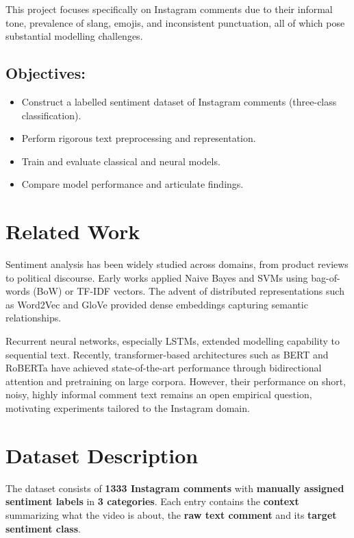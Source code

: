 \documentclass[11pt,a4paper]{article}
\begin{document}
This project focuses specifically on Instagram comments due to their informal tone, prevalence of slang, emojis, and inconsistent punctuation, all of which pose substantial modelling challenges.

\vspace{0.5em}
\subsection*{Objectives:}
\begin{itemize}
    \item Construct a labelled sentiment dataset of Instagram comments (three-class classification).
    \item Perform rigorous text preprocessing and representation.
    \item Train and evaluate classical and neural models.
    \item Compare model performance and articulate findings.
\end{itemize}


\section{Related Work}
Sentiment analysis has been widely studied across domains, from product reviews to political discourse. Early works applied Naive Bayes and SVMs using bag-of-words (BoW) or TF-IDF vectors. The advent of distributed representations such as Word2Vec and GloVe provided dense embeddings capturing semantic relationships.

Recurrent neural networks, especially LSTMs, extended modelling capability to sequential text. Recently, transformer-based architectures such as BERT and RoBERTa have achieved state-of-the-art performance through bidirectional attention and pretraining on large corpora. However, their performance on short, noisy, highly informal comment text remains an open empirical question, motivating experiments tailored to the Instagram domain.


\section{Dataset Description}
The dataset consists of \textbf{1333 Instagram comments} with \textbf{manually assigned sentiment labels} in \textbf{3 categories}. Each entry contains the \textbf{context} summarizing what the video is about, the \textbf{raw text comment} and its \textbf{target sentiment class}.
\end{document}
